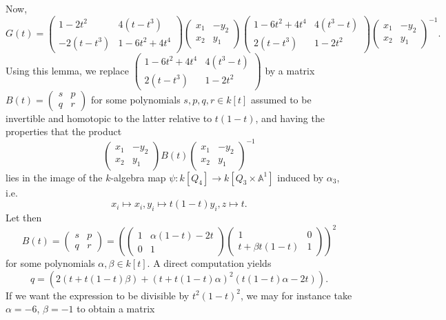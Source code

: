 \documentclass[11pt,leqno]{article}
\newcommand{\A}{{\mathbb A}}
\renewcommand{\1}{{\rm 1\hspace*{-0.4ex}%
\rule{0.1ex}{1.52ex}\hspace*{0.2ex}}}
\newcommand{\<}[1]{{\langle}#1 {\rangle}}
\theoremstyle{plain}
\theoremstyle{definition}
\theoremstyle{remark}
\numberwithin{equation}{section}
\begin{document}
Now, 
\[
G(t)=\begin{pmatrix} 1-2t^2 & 4(t-t^3) \\ -2(t-t^3) & 1-6t^2+4t^4 \end{pmatrix}\begin{pmatrix} x_1 & -y_2 \\ x_2 & y_1\end{pmatrix}\begin{pmatrix} 1-6t^2+4t^4 & 4(t^3-t) \\ 2(t-t^3) & 1-2t^2 \end{pmatrix}\begin{pmatrix} x_1 & -y_2 \\ x_2 & y_1 \end{pmatrix}^{-1}.
\]
Using this lemma, we replace $\begin{pmatrix} 1-6t^2+4t^4 & 4(t^3-t) \\ 2(t-t^3) & 1-2t^2 \end{pmatrix}$ by a matrix $B(t) = \begin{pmatrix} s & p \\ q & r\end{pmatrix}$ for some polynomials $s,p,q,r \in k[t]$ assumed to be invertible and homotopic to the latter relative to $t(1-t)$, and having the properties that the product 
\[
\begin{pmatrix} x_1 & -y_2 \\ x_2 & y_1\end{pmatrix}B(t)\begin{pmatrix} x_1 & -y_2 \\ x_2 & y_1\end{pmatrix}^{-1}
\] 
lies in the image of the $k$-algebra map $\psi \colon k[Q_4] \to k[Q_3\times \A^1]$ induced by $\alpha_3$, i.e.  
\[
x_i \mapsto x_i, y_i \mapsto t(1-t)y_i, z \mapsto t.
\]
Let then 
\[ 
B(t) = \begin{pmatrix} s & p \\ q & r\end{pmatrix} = \left (
\begin{pmatrix} 1 & \alpha(1-t)-2t \\ 0 & 1\end{pmatrix}\begin{pmatrix} 1 & 0 \\ t+\beta t(1-t) & 1\end{pmatrix}\right)^2
\] 
for some polynomials $\alpha,\beta\in k[t]$. A direct computation yields 
\[
q= (2(t+t(1-t)\beta)+(t+t(1-t)\alpha)^2(t(1-t)\alpha-2t)).
\] 
If we want the expression to be divisible by $t^2(1-t)^2$, we may for instance take $\alpha=-6$, $\beta=-1$ to obtain a matrix
\end{document}
